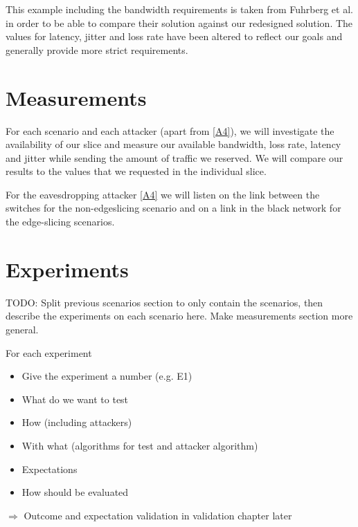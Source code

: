 This example including the bandwidth requirements is taken from Fuhrberg et al. \cite{SE4} in order to be able to compare their solution against our redesigned solution. The values for latency, jitter and loss rate have been altered to reflect our goals and generally provide more strict requirements.


\section{Measurements}
For each scenario and each attacker (apart from \ref{A4}), we will investigate the availability of our slice and measure our available bandwidth, loss rate, latency and jitter while sending the amount of traffic we reserved. We will compare our results to the values that we requested in the individual slice.

For the eavesdropping attacker \ref{A4} we will listen on the link between the switches for the non-edgeslicing scenario and on a link in the black network for the edge-slicing scenarios.

\section{Experiments}
TODO: Split previous scenarios section to only contain the scenarios, then describe the experiments on each scenario here. Make measurements section more general.

For each experiment
\begin{itemize}
    \item Give the experiment a number (e.g. E1)
    \item What do we want to test
    \item How (including attackers)
    \item With what (algorithms for test and attacker algorithm)
    \item Expectations
    \item How should be evaluated
\end{itemize}
$\Rightarrow$ Outcome and expectation validation in validation chapter later